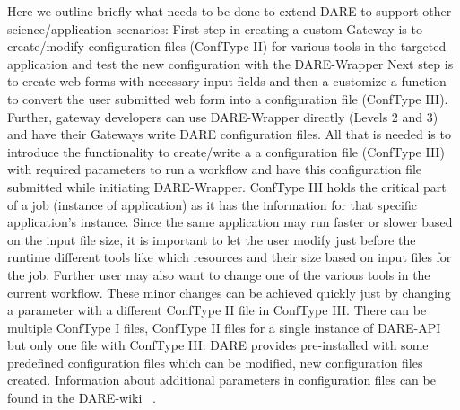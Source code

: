 \documentclass[]{svjour3}
\begin{document}
Here we outline briefly what needs to be done to extend DARE to
support other science/application scenarios: First step in creating a
custom Gateway is to create/modify configuration files (ConfType II)
for various tools in the targeted application and test the new
configuration with the DARE-Wrapper Next step is to create web forms
with necessary input fields and then a customize a function to convert
the user submitted web form into a configuration file (ConfType III).
Further, gateway developers can use DARE-Wrapper directly (Levels 2
and 3) and have their Gateways write DARE configuration files.  All
that is needed is to introduce the functionality to create/write a a
configuration file (ConfType III) with required parameters to run a
workflow and have this configuration file submitted while initiating
DARE-Wrapper. ConfType III holds the critical part of a job (instance
of application) as it has the information for that specific
application's instance. Since the same application may run faster or
slower based on the input file size, it is important to let the user
modify just before the runtime different tools like which resources
and their size based on input files for the job. Further user may also
want to change one of the various tools in the current workflow. These
minor changes can be achieved quickly just by changing a parameter
with a different ConfType II file in ConfType III.  There can be
multiple ConfType I files, ConfType II files for a single instance of
DARE-API but only one file with ConfType III.  DARE provides
pre-installed with some predefined configuration files which can be
modified, new configuration files created. Information about
additional parameters in configuration files can be found in the
DARE-wiki ~\cite{dare_api_web}.



\end{document}
